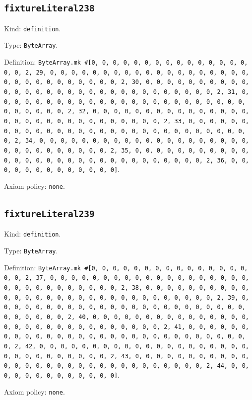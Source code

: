 \documentclass[11pt]{article}
\begin{document}
\subsection*{\texttt{fixtureLiteral238}}
\noindent Kind: \texttt{definition}.\par
\noindent Type: \texttt{ByteArray}.\par
\noindent Definition: \texttt{ByteArray.mk \#[0, 0, 0, 0, 0, 0, 0, 0, 0, 0, 0, 0, 0, 0, 0, 0, 0, 2, 29, 0, 0, 0, 0, 0, 0, 0, 0, 0, 0, 0, 0, 0, 0, 0, 0, 0, 0, 0, 0, 0, 0, 0, 0, 0, 0, 0, 0, 0, 0, 2, 30, 0, 0, 0, 0, 0, 0, 0, 0, 0, 0, 0, 0, 0, 0, 0, 0, 0, 0, 0, 0, 0, 0, 0, 0, 0, 0, 0, 0, 0, 0, 2, 31, 0, 0, 0, 0, 0, 0, 0, 0, 0, 0, 0, 0, 0, 0, 0, 0, 0, 0, 0, 0, 0, 0, 0, 0, 0, 0, 0, 0, 0, 0, 2, 32, 0, 0, 0, 0, 0, 0, 0, 0, 0, 0, 0, 0, 0, 0, 0, 0, 0, 0, 0, 0, 0, 0, 0, 0, 0, 0, 0, 0, 0, 0, 2, 33, 0, 0, 0, 0, 0, 0, 0, 0, 0, 0, 0, 0, 0, 0, 0, 0, 0, 0, 0, 0, 0, 0, 0, 0, 0, 0, 0, 0, 0, 0, 2, 34, 0, 0, 0, 0, 0, 0, 0, 0, 0, 0, 0, 0, 0, 0, 0, 0, 0, 0, 0, 0, 0, 0, 0, 0, 0, 0, 0, 0, 0, 0, 2, 35, 0, 0, 0, 0, 0, 0, 0, 0, 0, 0, 0, 0, 0, 0, 0, 0, 0, 0, 0, 0, 0, 0, 0, 0, 0, 0, 0, 0, 0, 0, 2, 36, 0, 0, 0, 0, 0, 0, 0, 0, 0, 0, 0, 0, 0]}.\par
\noindent Axiom policy: \texttt{none}.\par
\subsection*{\texttt{fixtureLiteral239}}
\noindent Kind: \texttt{definition}.\par
\noindent Type: \texttt{ByteArray}.\par
\noindent Definition: \texttt{ByteArray.mk \#[0, 0, 0, 0, 0, 0, 0, 0, 0, 0, 0, 0, 0, 0, 0, 0, 0, 2, 37, 0, 0, 0, 0, 0, 0, 0, 0, 0, 0, 0, 0, 0, 0, 0, 0, 0, 0, 0, 0, 0, 0, 0, 0, 0, 0, 0, 0, 0, 0, 2, 38, 0, 0, 0, 0, 0, 0, 0, 0, 0, 0, 0, 0, 0, 0, 0, 0, 0, 0, 0, 0, 0, 0, 0, 0, 0, 0, 0, 0, 0, 0, 2, 39, 0, 0, 0, 0, 0, 0, 0, 0, 0, 0, 0, 0, 0, 0, 0, 0, 0, 0, 0, 0, 0, 0, 0, 0, 0, 0, 0, 0, 0, 0, 2, 40, 0, 0, 0, 0, 0, 0, 0, 0, 0, 0, 0, 0, 0, 0, 0, 0, 0, 0, 0, 0, 0, 0, 0, 0, 0, 0, 0, 0, 0, 0, 2, 41, 0, 0, 0, 0, 0, 0, 0, 0, 0, 0, 0, 0, 0, 0, 0, 0, 0, 0, 0, 0, 0, 0, 0, 0, 0, 0, 0, 0, 0, 0, 2, 42, 0, 0, 0, 0, 0, 0, 0, 0, 0, 0, 0, 0, 0, 0, 0, 0, 0, 0, 0, 0, 0, 0, 0, 0, 0, 0, 0, 0, 0, 0, 2, 43, 0, 0, 0, 0, 0, 0, 0, 0, 0, 0, 0, 0, 0, 0, 0, 0, 0, 0, 0, 0, 0, 0, 0, 0, 0, 0, 0, 0, 0, 0, 2, 44, 0, 0, 0, 0, 0, 0, 0, 0, 0, 0, 0, 0, 0]}.\par
\noindent Axiom policy: \texttt{none}.\par
\end{document}
